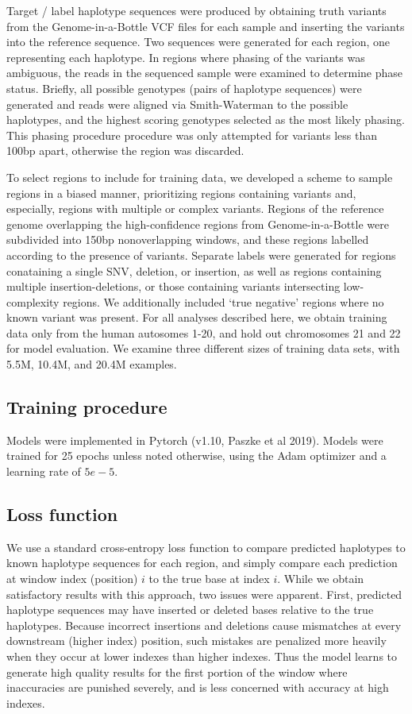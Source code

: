 \documentclass[]{article}
\begin{document}
Target / label haplotype sequences were produced by obtaining truth variants from the Genome-in-a-Bottle VCF files for each sample and inserting the variants into the reference sequence. Two sequences were generated for each region, one representing each haplotype. In regions where phasing of the variants was ambiguous, the reads in the sequenced sample were examined to determine phase status. Briefly, all possible genotypes (pairs of haplotype sequences) were generated and reads were aligned via Smith-Waterman to the possible haplotypes, and the highest scoring genotypes selected as the most likely phasing. This phasing procedure procedure was only attempted for variants less than 100bp apart, otherwise the region was discarded.

To select regions to include for training data, we developed a scheme to sample regions in a biased manner, prioritizing regions containing variants and, especially, regions with multiple or complex variants. Regions of the reference genome overlapping the high-confidence regions from Genome-in-a-Bottle were subdivided into 150bp nonoverlapping windows, and these regions labelled according to the presence of variants. Separate labels were generated for regions conataining a single SNV, deletion, or insertion, as well as regions containing multiple insertion-deletions, or those containing variants intersecting  low-complexity regions. We additionally included `true negative' regions where no known variant was present.  For all analyses described here, we obtain training data only from the human autosomes 1-20, and hold out chromosomes 21 and 22 for model evaluation.  We examine three different sizes of training data sets, with 5.5M, 10.4M, and 20.4M examples. 

\subsection{Training procedure}

Models were implemented in Pytorch (v1.10, Paszke et al 2019). Models were trained for 25 epochs unless noted otherwise, using the Adam optimizer and a learning rate of $5e-5$. 

\subsection{Loss function}

We use a standard cross-entropy loss function to compare predicted haplotypes to known haplotype sequences for each region, and simply compare each prediction at window index (position) $i$ to the true base at index $i$.  While we obtain satisfactory results with this approach, two issues were apparent. First, predicted haplotype sequences may have inserted or deleted bases relative to the true haplotypes. Because incorrect insertions and deletions cause mismatches at every downstream (higher index) position, such mistakes are penalized more heavily when they occur at lower indexes than higher indexes. Thus the model learns to generate high quality results for the first portion of the window where inaccuracies are punished severely, and is less concerned with accuracy at high indexes. 
\end{document}
